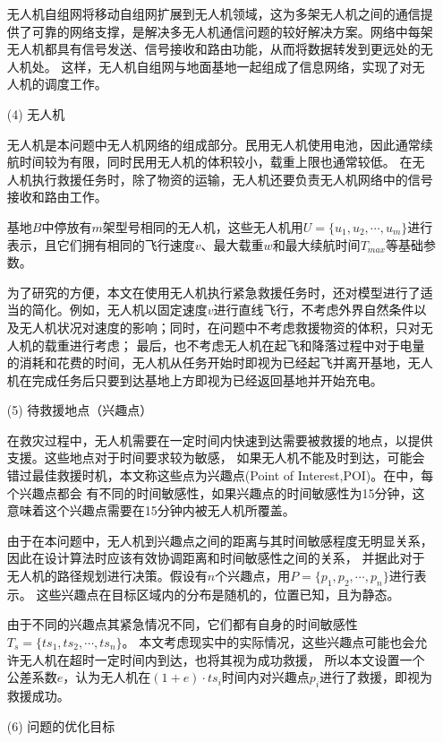 \begin{itemize}
	\qquad 无人机自组网将移动自组网扩展到无人机领域，这为多架无人机之间的通信提供了可靠的网络支撑，是解决多无人机通信问题的较好解决方案。网络中每架无人机都具有信号发送、信号接收和路由功能，从而将数据转发到更远处的无人机处。
	这样，无人机自组网与地面基地一起组成了信息网络，实现了对无人机的调度工作。

	\item[(4)]
	无人机

	
	\qquad 无人机是本问题中无人机网络的组成部分。民用无人机使用电池，因此通常续航时间较为有限，同时民用无人机的体积较小，载重上限也通常较低。
	在无人机执行救援任务时，除了物资的运输，无人机还要负责无人机网络中的信号接收和路由工作。

	\qquad 基地$B$中停放有$m$架型号相同的无人机，这些无人机用$U=\lbrace u_1, u_2, \cdots ,u_m \rbrace$进行表示，且它们拥有相同的飞行速度$v$、最大载重$w$和最大续航时间$T_{max}$等基础参数。

	\qquad 为了研究的方便，本文在使用无人机执行紧急救援任务时，还对模型进行了适当的简化。例如，无人机以固定速度$v$进行直线飞行，不考虑外界自然条件以及无人机状况对速度的影响；同时，在问题中不考虑救援物资的体积，只对无人机的载重进行考虑；
	最后，也不考虑无人机在起飞和降落过程中对于电量的消耗和花费的时间，无人机从任务开始时即视为已经起飞并离开基地，无人机在完成任务后只要到达基地上方即视为已经返回基地并开始充电。
	\item[(5)]
	待救援地点（兴趣点）


	\qquad 在救灾过程中，无人机需要在一定时间内快速到达需要被救援的地点，以提供支援。这些地点对于时间要求较为敏感，
	如果无人机不能及时到达，可能会错过最佳救援时机，本文称这些点为兴趣点(Point of Interest,POI)。在中，每个兴趣点都会
	有不同的时间敏感性，如果兴趣点的时间敏感性为15分钟，这意味着这个兴趣点需要在15分钟内被无人机所覆盖。


	\qquad 由于在本问题中，无人机到兴趣点之间的距离与其时间敏感程度无明显关系，因此在设计算法时应该有效协调距离和时间敏感性之间的关系，
	并据此对于无人机的路径规划进行决策。假设有$n$个兴趣点，用$P=\lbrace p_1, p_2, \cdots ,p_n \rbrace$进行表示。
	这些兴趣点在目标区域内的分布是随机的，位置已知，且为静态。


	\qquad 由于不同的兴趣点其紧急情况不同，它们都有自身的时间敏感性$T_s=\lbrace ts_1, ts_2, \cdots ,ts_n \rbrace$。
	本文考虑现实中的实际情况，这些兴趣点可能也会允许无人机在超时一定时间内到达，也将其视为成功救援，
	所以本文设置一个公差系数$e$，认为无人机在$(1+e) \cdot ts_i$时间内对兴趣点$p_i$进行了救援，即视为救援成功。


	\item[(6)]
	问题的优化目标


\end{itemize}
